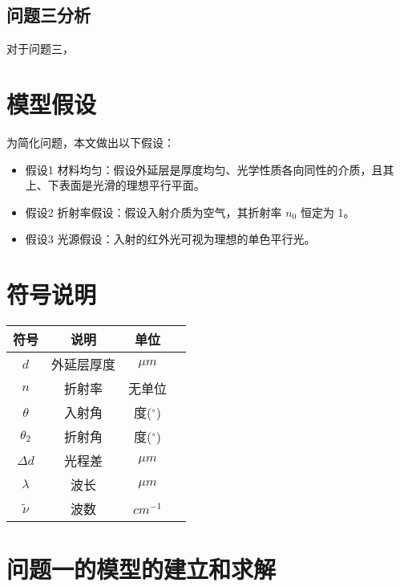 \documentclass{cumcmthesis}
\begin{document}
\subsection{问题三分析}
对于问题三，



\section{模型假设}

为简化问题，本文做出以下假设：

\begin{itemize}[itemindent=2em]
\item 假设1 材料均匀：假设外延层是厚度均匀、光学性质各向同性的介质，且其上、下表面是光滑的理想平行平面。
\item 假设2 折射率假设：假设入射介质为空气，其折射率 $n_0$ 恒定为 1。

\item 假设3 光源假设：入射的红外光可视为理想的单色平行光。
\end{itemize}


\section{符号说明}
\begin{table}[H]
\centering
\begin{tabularx}{\textwidth}{CCCC}%
\toprule
符号    & 说明    & 单位    \\
\midrule
$d$     & 外延层厚度 & $\mu m$ \\
$n$     & 折射率 & 无单位 \\
$\theta$ & 入射角 & 度($^\circ$) \\
$\theta_2$ & 折射角 & 度($^\circ$) \\
$\Delta d$ & 光程差 & $\mu m$ \\
$\lambda$ & 波长 & $\mu m$ \\
$\tilde{\nu}$ & 波数 & $cm^{-1}$ \\
\bottomrule
\end{tabularx}
\label{tab:符号说明}
\end{table}

\section{问题一的模型的建立和求解}
\end{document}
